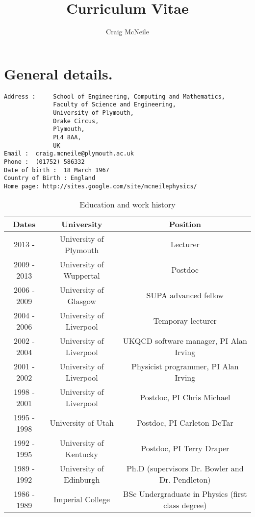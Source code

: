 \documentclass[12pt]{article}
\begin{document}
\title{Curriculum Vitae}

\author{Craig McNeile}

\maketitle

\section{General details.}
\begin{verbatim}
Address :     School of Engineering, Computing and Mathematics,
              Faculty of Science and Engineering,
              University of Plymouth,
              Drake Circus,
              Plymouth,
              PL4 8AA,
              UK             
Email :  craig.mcneile@plymouth.ac.uk
Phone :  (01752) 586332
Date of birth :  18 March 1967
Country of Birth : England
Home page: http://sites.google.com/site/mcneilephysics/
\end{verbatim}

%

\begin{table}[tb]
\centering
\begin{tabular}{|c|c|c|} \hline
Dates & University  &  Position \\  \hline
2013 -  & University of Plymouth   & Lecturer \\
2009 - 2013 & University of Wuppertal & Postdoc \\
2006 - 2009 & University of Glasgow & SUPA advanced fellow \\
2004 - 2006 & University of Liverpool & Temporay lecturer \\
2002 - 2004 & University of Liverpool & UKQCD software manager, PI Alan Irving \\
2001 - 2002 & University of Liverpool & Physicist programmer, PI Alan Irving \\
1998 - 2001 & University of Liverpool & Postdoc, PI Chris Michael \\
1995 - 1998 & University of Utah & Postdoc, PI Carleton DeTar \\
1992 - 1995 & University of Kentucky & Postdoc, PI Terry Draper \\
1989 - 1992 & University of Edinburgh & Ph.D (supervisors Dr. Bowler and Dr. Pendleton) \\ 
1986 - 1989 & Imperial College & BSc Undergraduate in Physics (first class degree) \\
\hline
\end{tabular}
\label{tb:life}
\caption{Education and work history}
\end{table}
\end{document}
